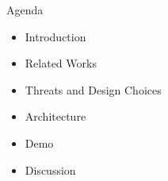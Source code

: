 \begin{frame}{Agenda}
    \begin{itemize}
        \item Introduction
        \item Related Works
        \item Threats and Design Choices
        \item Architecture
        \item Demo
        \item Discussion
    \end{itemize}
\end{frame}
